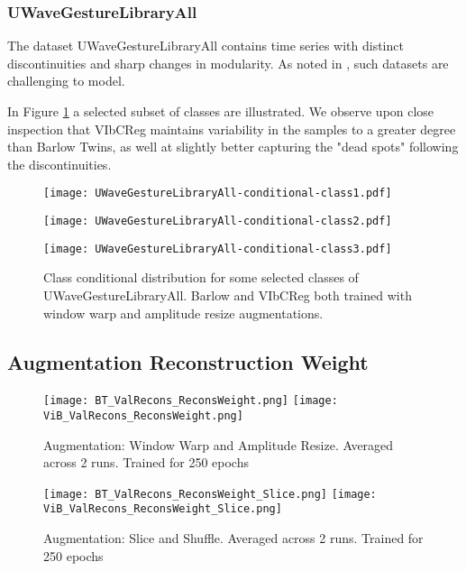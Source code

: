 \documentclass[../../thesis.tex]{subfiles}
\begin{document}
\subsubsection{UWaveGestureLibraryAll}
The dataset UWaveGestureLibraryAll contains time series with distinct discontinuities and sharp changes in modularity. As noted in \cite{TimeVQVAE}, such datasets are challenging to model.\newline

In Figure \ref{fig:Warp_Uwave} a selected subset of classes are illustrated. We observe upon close inspection that VIbCReg maintains variability in the samples to a greater degree than Barlow Twins, as well at slightly better capturing the "dead spots" following the discontinuities. \newline 


\begin{figure}[H]
    \centering
    \begin{minipage}[b]{0.32\textwidth}
        \centering
        \texttt{[image: UWaveGestureLibraryAll-conditional-class1.pdf]}
    \end{minipage}
    \begin{minipage}[b]{0.32\textwidth}
        \centering
        \texttt{[image: UWaveGestureLibraryAll-conditional-class2.pdf]}
    \end{minipage}
    \begin{minipage}[b]{0.32\textwidth}
        \centering
        \texttt{[image: UWaveGestureLibraryAll-conditional-class3.pdf]}
    \end{minipage}
    \caption{Class conditional distribution for some selected classes of UWaveGestureLibraryAll. Barlow and VIbCReg both trained with window warp and amplitude resize augmentations.}
    \label{fig:Warp_Uwave}
\end{figure}





\subsection{Augmentation Reconstruction Weight}
\begin{figure}[h]
    \texttt{[image: BT\_ValRecons\_ReconsWeight.png]}
    \texttt{[image: ViB\_ValRecons\_ReconsWeight.png]}
    \caption{Augmentation: Window Warp and Amplitude Resize. Averaged across 2 runs. Trained for 250 epochs}  
    \label{fig:ReconsWeight_warp}
\end{figure}
\begin{figure}[h]
    \texttt{[image: BT\_ValRecons\_ReconsWeight\_Slice.png]}
    \texttt{[image: ViB\_ValRecons\_ReconsWeight\_Slice.png]}
    \caption{Augmentation: Slice and Shuffle. Averaged across 2 runs. Trained for 250 epochs}  
    \label{fig:ReconsWeight_slice}
\end{figure}
\end{document}
